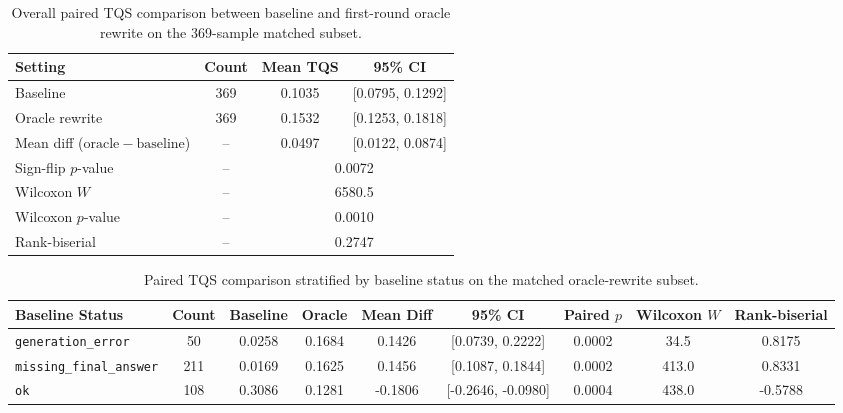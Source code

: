 \begin{table}[t]
\centering
\small
\caption{Overall paired TQS comparison between baseline and first-round oracle rewrite on the 369-sample matched subset.}
\label{tab:oracle-rewrite-overall}
\begin{tabular}{lccc}
\toprule
Setting & Count & Mean TQS & 95\% CI \\
\midrule
Baseline & 369 & 0.1035 & [0.0795, 0.1292] \\
Oracle rewrite & 369 & 0.1532 & [0.1253, 0.1818] \\
\midrule
Mean diff ($\mathrm{oracle} - \mathrm{baseline}$) & -- & 0.0497 & [0.0122, 0.0874] \\
Sign-flip $p$-value & -- & \multicolumn{2}{c}{0.0072} \\
Wilcoxon $W$ & -- & \multicolumn{2}{c}{6580.5} \\
Wilcoxon $p$-value & -- & \multicolumn{2}{c}{0.0010} \\
Rank-biserial & -- & \multicolumn{2}{c}{0.2747} \\
\bottomrule
\end{tabular}
\end{table}

\begin{table}[t]
\centering
\small
\caption{Paired TQS comparison stratified by baseline status on the matched oracle-rewrite subset.}
\label{tab:oracle-rewrite-stratified}
\begin{tabular}{lcccccccc}
\toprule
Baseline Status & Count & Baseline & Oracle & Mean Diff & 95\% CI & Paired $p$ & Wilcoxon $W$ & Rank-biserial \\
\midrule
\texttt{generation\_error} & 50 & 0.0258 & 0.1684 & 0.1426 & [0.0739, 0.2222] & 0.0002 & 34.5 & 0.8175 \\
\texttt{missing\_final\_answer} & 211 & 0.0169 & 0.1625 & 0.1456 & [0.1087, 0.1844] & 0.0002 & 413.0 & 0.8331 \\
\texttt{ok} & 108 & 0.3086 & 0.1281 & -0.1806 & [-0.2646, -0.0980] & 0.0004 & 438.0 & -0.5788 \\
\bottomrule
\end{tabular}
\end{table}

